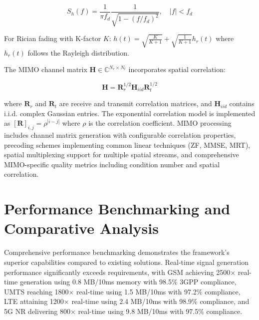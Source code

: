 \documentclass[twocolumn,10pt]{article}
\begin{document}
\begin{equation}
S_h(f) = \frac{1}{\pi f_d} \frac{1}{\sqrt{1-(f/f_d)^2}}, \quad |f| < f_d
\end{equation}

For Rician fading with K-factor $K$: $h(t) = \sqrt{\frac{K}{K+1}} + \sqrt{\frac{1}{K+1}} h_r(t)$ where $h_r(t)$ follows the Rayleigh distribution.

The MIMO channel matrix $\mathbf{H} \in \mathbb{C}^{N_r \times N_t}$ incorporates spatial correlation:

\begin{equation}
\mathbf{H} = \mathbf{R}_r^{1/2} \mathbf{H}_{iid} \mathbf{R}_t^{1/2}
\end{equation}

where $\mathbf{R}_r$ and $\mathbf{R}_t$ are receive and transmit correlation matrices, and $\mathbf{H}_{iid}$ contains i.i.d. complex Gaussian entries. The exponential correlation model is implemented as $[\mathbf{R}]_{i,j} = \rho^{|i-j|}$ where $\rho$ is the correlation coefficient. MIMO processing includes channel matrix generation with configurable correlation properties, precoding schemes implementing common linear techniques (ZF, MMSE, MRT), spatial multiplexing support for multiple spatial streams, and comprehensive MIMO-specific quality metrics including condition number and spatial correlation.

\section{Performance Benchmarking and Comparative Analysis}

Comprehensive performance benchmarking demonstrates the framework's superior capabilities compared to existing solutions. Real-time signal generation performance significantly exceeds requirements, with GSM achieving 2500$\times$ real-time generation using 0.8 MB/10ms memory with 98.5\% 3GPP compliance, UMTS reaching 1800$\times$ real-time using 1.5 MB/10ms with 97.2\% compliance, LTE attaining 1200$\times$ real-time using 2.4 MB/10ms with 98.9\% compliance, and 5G NR delivering 800$\times$ real-time using 9.8 MB/10ms with 97.5\% compliance.
\end{document}
